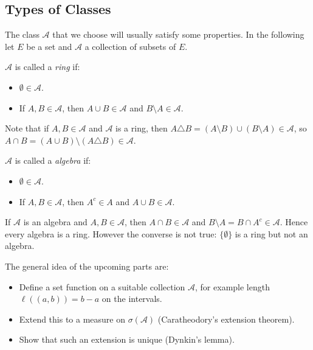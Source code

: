 \documentclass[12pt]{article}
\begin{document}
\subsection{Types of Classes}
\label{sub:class_type}

The class $\mathcal{A}$ that we choose will usually satisfy some properties. In the following let $E$ be a set and $\mathcal{A}$ a collection of subsets of $E$.

\begin{definition}
	$\mathcal{A}$ is called a \emph{ring} if:
	\begin{itemize}
		\item $\emptyset \in \mathcal{A}$.
		\item If $A, B \in \mathcal{A}$, then $A \cup B \in \mathcal{A}$ and $B \setminus A \in \mathcal{A}$.
	\end{itemize}
\end{definition}

Note that if $A, B \in \mathcal{A}$ and $\mathcal{A}$ is a ring, then $A \triangle B = (A \setminus B) \cup (B \setminus A) \in \mathcal{A}$, so $A \cap B = (A \cup B) \setminus (A \triangle B) \in \mathcal{A}$.

\begin{definition}
	$\mathcal{A}$ is called a \emph{algebra} if:
	\begin{itemize}
		\item $\emptyset \in \mathcal{A}$.
		\item If $A, B \in \mathcal{A}$, then $A^{c} \in A$ and $A \cup B \in \mathcal{A}$.
	\end{itemize}
\end{definition}

If $\mathcal{A}$ is an algebra and $A, B \in \mathcal{A}$, then  $A \cap B \in \mathcal{A}$ and $B \setminus A = B \cap A^{c} \in \mathcal{A}$. Hence every algebra is a ring. However the converse is not true: $\{\emptyset\}$ is a ring but not an algebra.

The general idea of the upcoming parts are:
\begin{itemize}
	\item Define a set function on a suitable collection $\mathcal{A}$, for example length $\ell((a, b)) = b - a$ on the intervals.
	\item Extend this to a measure on $\sigma(\mathcal{A})$ (Caratheodory's extension theorem).
	\item Show that such an extension is unique (Dynkin's lemma).
\end{itemize}
\end{document}
